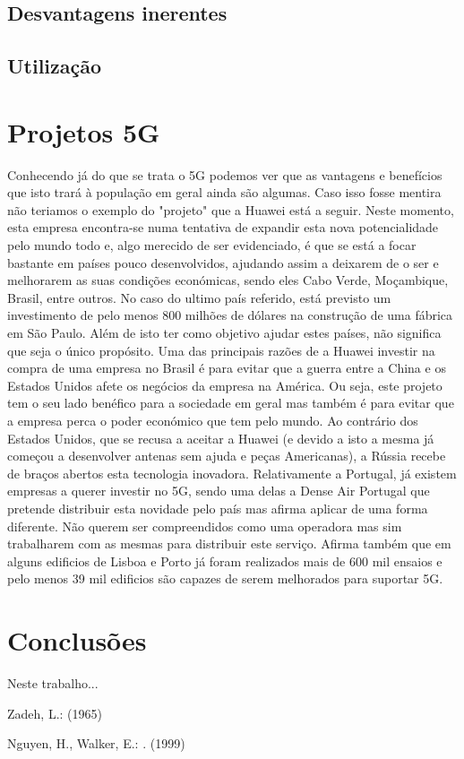 \documentclass{llncs}
\begin{document}
\subsection{Desvantagens inerentes}
\subsection{Utilização}
\section{Projetos 5G}
Conhecendo já do que se trata o 5G podemos ver que as vantagens e 
benefícios que isto trará à população em geral ainda são algumas.
Caso isso fosse mentira não teriamos o exemplo do "projeto" que a
Huawei está a seguir. Neste momento, esta empresa encontra-se numa 
tentativa de expandir esta nova potencialidade pelo mundo todo e,
algo merecido de ser evidenciado, é que se está a focar bastante em
países pouco desenvolvidos, ajudando assim a deixarem de o ser e melhorarem as suas
condições económicas, sendo eles Cabo Verde, Moçambique, Brasil, entre
outros. No caso do ultimo país referido, está previsto um investimento
de pelo menos 800 milhões de dólares na construção de uma fábrica em 
São Paulo. Além de isto ter como objetivo ajudar estes países, não significa 
que seja o único propósito. Uma das principais razões de a Huawei investir na compra
de uma empresa no Brasil é para evitar que a guerra entre a China e os Estados Unidos
afete os negócios da empresa na América. Ou seja, este projeto tem o seu lado benéfico
para a sociedade em geral mas também é para evitar que a empresa perca o poder económico
que tem pelo mundo.
Ao contrário dos Estados Unidos, que se recusa a aceitar a Huawei (e devido a isto
a mesma já começou a desenvolver antenas sem ajuda e peças Americanas), a Rússia recebe de braços
abertos esta tecnologia inovadora. Relativamente a Portugal, já existem empresas a querer
investir no 5G, sendo uma delas a Dense Air Portugal que pretende distribuir esta novidade
pelo país mas afirma aplicar de uma forma diferente. Não querem ser compreendidos como 
uma operadora mas sim trabalharem com as mesmas para distribuir este serviço. Afirma também
que em alguns edificios de Lisboa e Porto já foram realizados mais de 600 mil ensaios e pelo menos 39 mil edificios são capazes de serem melhorados para suportar 5G.
\section{Conclusões}

Neste trabalho...

%

\begin{thebibliography}{1}
Zadeh, L.:
 (1965)

Nguyen, H., Walker, E.:
.
 (1999)
\end{thebibliography}
\end{document}
